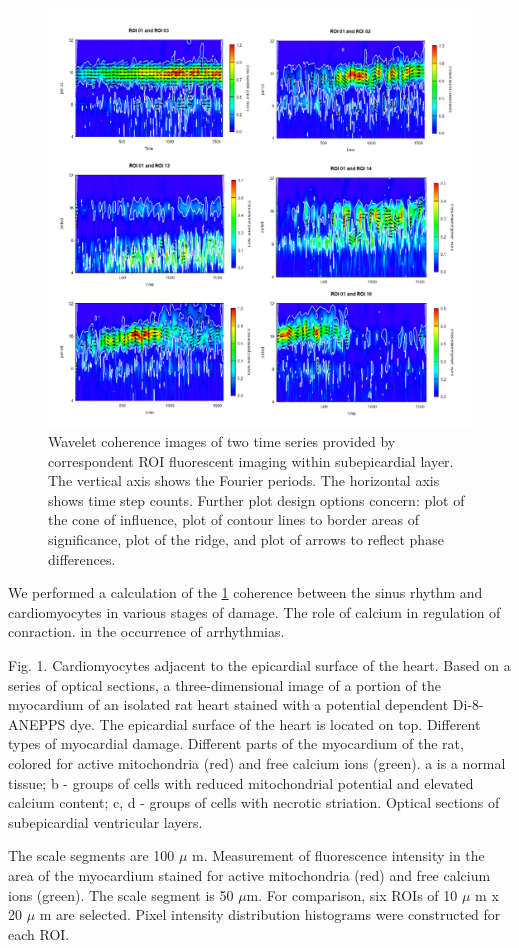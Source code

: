 \documentclass{biophys-new}
\begin{document}
\begin{figure}[hbt!]
\centering
\includegraphics[width=0.8\linewidth]{fig8.png}
\caption{Wavelet coherence images of two time series provided by correspondent ROI fluorescent imaging within subepicardial layer.
The vertical axis shows the Fourier periods. The horizontal axis shows time step counts.
Further plot design options concern: plot of the cone of influence, plot of contour lines to border areas of significance, plot of the ridge, and plot of arrows to reflect phase differences.}
\label{fig:fig8}
\end{figure}


We performed a calculation of the \ref{fig:fig8} coherence between the sinus rhythm and cardiomyocytes in various stages of damage.
The role of calcium in regulation of conraction.
in the occurrence of arrhythmias.


Fig. 1. Cardiomyocytes adjacent to the epicardial surface of the heart.
Based on a series of optical sections, a three-dimensional image of a portion of the myocardium of an isolated rat heart stained with a potential dependent Di-8-ANEPPS dye.
The epicardial surface of the heart is located on top.
Different types of myocardial damage.
Different parts of the myocardium of the rat, colored for active mitochondria (red) and free calcium ions (green). a is a normal tissue; b - groups of cells with reduced mitochondrial potential and elevated calcium content; c, d - groups of cells with necrotic striation. Optical sections of subepicardial ventricular layers.


The scale segments are 100 $\mu$ m.
Measurement of fluorescence intensity in the area of the myocardium stained for active mitochondria (red) and free calcium ions (green).
The scale segment is 50 $\mu$m.
For comparison, six ROIs of 10 $\mu$ m x 20 $\mu$ m are selected.
Pixel intensity distribution histograms were constructed for each ROI.
\end{document}
